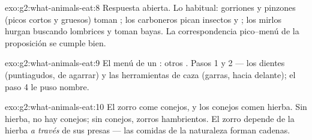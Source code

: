 \begin{solution}{exo:g2:what-animals-eat:8}
Respuesta abierta. Lo habitual: gorriones y pinzones (picos cortos y
gruesos) toman ; los carboneros pican insectos y ; los
mirlos hurgan buscando lombrices y toman bayas. La correspondencia
pico--menú de la proposición se cumple bien.
\end{solution}

\begin{solution}{exo:g2:what-animals-eat:9}
El menú de un : otros . Pasos 1 y 2 --- los dientes
(puntiagudos, de agarrar) y las herramientas de caza (garras, 
hacia delante); el paso 4 le puso nombre.
\end{solution}

\begin{solution}{exo:g2:what-animals-eat:10}
El zorro come conejos, y los conejos comen hierba. Sin hierba, no hay
conejos; sin conejos, zorros hambrientos. El zorro depende de la
hierba \emph{a través} de sus presas --- las comidas de la naturaleza
forman cadenas.
\end{solution}
